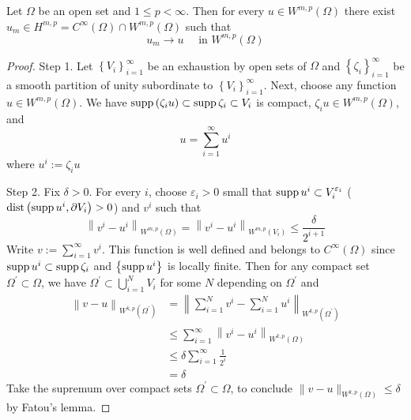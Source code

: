 \begin{theorem}[$H=W$]
    \label{thm: H=W}
    Let $\Omega$ be an open set and $1\leq p < \infty$.
    Then for every $u \in W^{m, p}\left(\Omega\right)$ there exist $u_m \in H^{m, p}= C^{\infty}\left(\Omega\right) \cap W^{m, p}\left(\Omega\right)$ such that
    \begin{equation*}
        u_m \rightarrow u \quad \text { in } W^{m, p}\left(\Omega\right)
    \end{equation*}
    \begin{proof}
        Step 1.
        Let $\left\{V_i\right\}_{i=1}^\infty$ be an exhaustion by open sets of $\Omega$ and $\left\{\zeta_i\right\}_{i=1}^{\infty}$ be a smooth partition of unity subordinate to $\left\{V_i\right\}_{i=1}^{\infty}$.
        Next, choose any function $u \in W^{m, p}\left(\Omega\right)$. We have $\operatorname{\operatorname{supp}}\left(\zeta_i u\right) \subset \operatorname{\operatorname{supp}} \zeta_i \subset V_i$ is compact, $\zeta_i u \in W^{m, p}\left(\Omega\right)$,  and
        \begin{equation*}
            u=\sum_{i=1}^\infty u^i
        \end{equation*}
        where $u^i:=\zeta_i u$

        Step 2.
        Fix $\delta>0$. For every $i$, choose $\varepsilon_i>0$ small that $\operatorname{\operatorname{supp}} u^i \subset V_i^{\varepsilon_i}$ ($\operatorname{dist}\left(\operatorname{\operatorname{supp}} u^i, \partial V_i\right)>0$) and $v^i$ such that
        \begin{equation*}
            \left\|v^i-u^i\right\|_{W^{m , p}\left(\Omega\right)}
            =\left\|v^i-u^i\right\|_{W^{m , p}(V_i)}
            \leq \frac{\delta}{2^{i+1}}
        \end{equation*}
        Write $v:=\sum_{i=1}^{\infty} v^i$. This function is well defined and belongs to $C^{\infty}\left(\Omega\right)$ since $\operatorname{\operatorname{supp}} u^i\subset \operatorname{\operatorname{supp}} \zeta_i$ and $\left\{\operatorname{\operatorname{supp}} u^i\right\}$ is locally finite.
        Then for any compact set $\Omega^\prime \subset \Omega$, we have $\Omega^\prime \subset \bigcup_{i=1}^N V_i$ for some $N$ depending on $\Omega^\prime$ and
        \begin{equation*}
            \begin{aligned}
                \left\|v-u\right\|_{W^{k, p}(\Omega^\prime)} & = \left\|\sum_{i=1}^N v^i -\sum_{i=1}^N u^i\right\|_{W^{k, p}(\Omega^\prime)} \\
                                                             & \leq \sum_{i=1}^{\infty}\left\|v^i-u^i\right\|_{W^{k, p}\left(\Omega\right)}  \\
                                                             & \leq \delta \sum_{i=1}^{\infty} \frac{1}{2^i}                                 \\
                                                             & =\delta
            \end{aligned}
        \end{equation*}
        Take the supremum over compact sets $\Omega^\prime \subset \Omega$, to conclude $\|v-u\|_{W^{k, p}\left(\Omega\right)} \leq \delta$ by Fatou's lemma.
    \end{proof}
\end{theorem}


